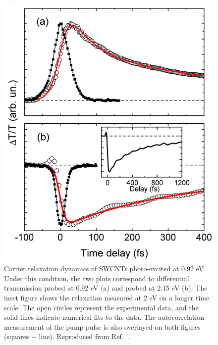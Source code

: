 \begin{figure}[H]
	\centering
	\includegraphics[scale=0.2]{images/chapter_prior_works/e11_pump_probe_manzoni}
	\caption{Carrier relaxation dynamics of SWCNTs photo-excited at 0.92 eV. Under this condition, the two plots correspond to differential transmission probed at 0.92 eV (a) and probed at 2.15 eV (b). The inset figure shows the relaxation measured at 2 eV on a longer time scale. The open circles represent the experimental data, and the solid lines indicate numerical fits to the data. The autocorrelation measurement of the pump pulse is also overlayed on both figures (squares + line). Reproduced from Ref.\ \cite{manzoni2005intersubband}.}
	\label{fig:e11_pump_manzoni}
\end{figure}

